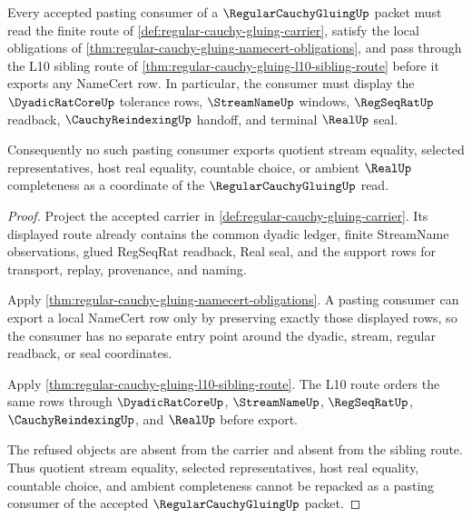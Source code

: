 \begin{theorem}
\label{thm:regular-cauchy-gluing-pasting-nonescape}
Every accepted pasting consumer of a $\RegularCauchyGluingUp$ packet must read the finite route of \autoref{def:regular-cauchy-gluing-carrier}, satisfy the local obligations of \autoref{thm:regular-cauchy-gluing-namecert-obligations}, and pass through the L10 sibling route of \autoref{thm:regular-cauchy-gluing-l10-sibling-route} before it exports any NameCert row. In particular, the consumer must display the $\DyadicRatCoreUp$ tolerance rows, $\StreamNameUp$ windows, $\RegSeqRatUp$ readback, $\CauchyReindexingUp$ handoff, and terminal $\RealUp$ seal.

Consequently no such pasting consumer exports quotient stream equality, selected representatives, host real equality, countable choice, or ambient $\RealUp$ completeness as a coordinate of the $\RegularCauchyGluingUp$ read.
\end{theorem}
\begin{proof}
Project the accepted carrier in \autoref{def:regular-cauchy-gluing-carrier}. Its displayed route already contains the common dyadic ledger, finite StreamName observations, glued RegSeqRat readback, Real seal, and the support rows for transport, replay, provenance, and naming.

Apply \autoref{thm:regular-cauchy-gluing-namecert-obligations}. A pasting consumer can export a local NameCert row only by preserving exactly those displayed rows, so the consumer has no separate entry point around the dyadic, stream, regular readback, or seal coordinates.

Apply \autoref{thm:regular-cauchy-gluing-l10-sibling-route}. The L10 route orders the same rows through $\DyadicRatCoreUp$, $\StreamNameUp$, $\RegSeqRatUp$, $\CauchyReindexingUp$, and $\RealUp$ before export.

The refused objects are absent from the carrier and absent from the sibling route. Thus quotient stream equality, selected representatives, host real equality, countable choice, and ambient completeness cannot be repacked as a pasting consumer of the accepted $\RegularCauchyGluingUp$ packet.
\end{proof}

